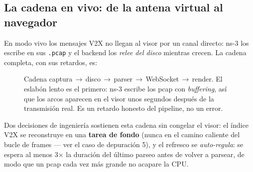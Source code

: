 \documentclass[11pt,a4paper]{article}
\begin{document}
\subsection{La cadena en vivo: de la antena virtual al navegador}
\label{sec:cadena}

En modo vivo los mensajes V2X no llegan al visor por un canal directo: ns-3
los escribe en sus \texttt{.pcap} y el backend los \emph{relee del disco}
mientras crecen. La cadena completa, con sus retardos, es:

\begin{figure}[h!]
\centering
{}
\caption{Cadena captura\,$\to$\,disco\,$\to$\,parser\,$\to$\,WebSocket\,$\to$\,render.
El eslabón lento es el primero: ns-3 escribe los pcap con \emph{buffering}, así
que los arcos aparecen en el visor unos segundos después de la transmisión
real. Es un retardo honesto del pipeline, no un error.}
\label{fig:cadena}
\end{figure}

Dos decisiones de ingeniería sostienen esta cadena sin congelar el visor:
el índice V2X se reconstruye en una \textbf{tarea de fondo} (nunca en el
camino caliente del bucle de frames --- ver el caso de depuración 5), y el
refresco se \emph{auto-regula}: se espera al menos
3$\times$ la duración del último parseo antes de volver a parsear, de modo que
un pcap cada vez más grande no acapare la CPU.
\end{document}
